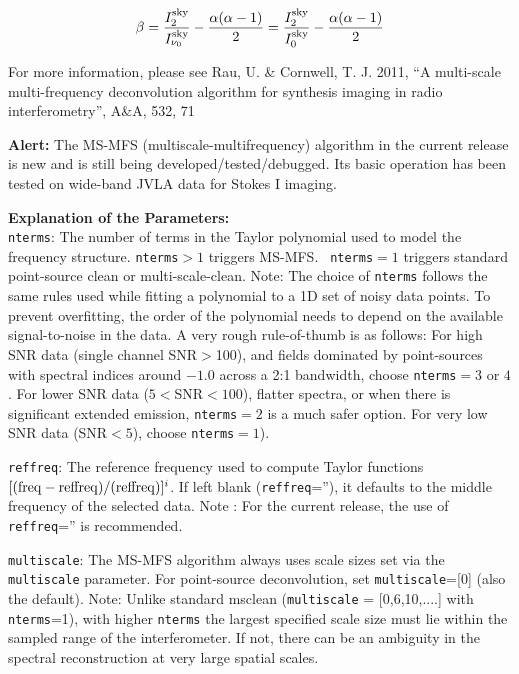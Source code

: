 \begin{equation}
\beta=\frac{I_2^{\rm sky}}{I_{\nu_0}^{\rm sky}}-\frac{\alpha(\alpha-1)}{2}=\frac{I_2^{\rm sky}}{I_{0}^{\rm sky}}-\frac{\alpha(\alpha-1)}{2}
\label{eq.ia:taylorbeta}
\end{equation}



For more information, please see Rau, U. \& Cornwell, T. J. 2011, ``A
multi-scale multi-frequency deconvolution algorithm for synthesis
imaging in radio interferometry'', A\&A, 532, 71 %

{\bf Alert:} The MS-MFS (multiscale-multifrequency) algorithm in the
current release is new and is still being
developed/tested/debugged. Its basic operation has been tested on
wide-band JVLA data for Stokes I imaging.

{\bf Explanation of the Parameters:} \\
{\tt nterms}: The number of terms in the Taylor polynomial used to
model the frequency structure.  {\tt nterms}$>1$ triggers MS-MFS. {\tt
  nterms}$=1$ triggers standard point-source clean or
multi-scale-clean.  Note: The choice of {\tt nterms} follows the same
rules used while fitting a polynomial to a 1D set of noisy data
points. To prevent overfitting, the order of the polynomial needs to
depend on the available signal-to-noise in the data.  A very rough
rule-of-thumb is as follows: For high SNR data (single channel
SNR$>$100), and fields dominated by point-sources with spectral
indices around $-1.0$ across a 2:1 bandwidth, choose {\tt nterms}$=3$
or $4$. For lower SNR data ($5<$SNR$<100$), flatter spectra, or when
there is significant extended emission, {\tt nterms}$=2$ is a much
safer option. For very low SNR data (SNR$<5$), choose {\tt nterms}$=1$).



{\tt reffreq}: The reference frequency used to compute Taylor
functions $[ ({\rm freq} - {\rm reffreq})/({\rm reffreq}) ]^{i}$.  If
left blank ({\tt reffreq}=''), it defaults to the middle frequency of
the selected data.  Note : For the current release, the use of {\tt
  reffreq}='' is recommended.



{\tt multiscale}: The MS-MFS algorithm always uses scale sizes set via
the {\tt multiscale} parameter.  For point-source deconvolution, set
{\tt multiscale}=[0] (also the default).  Note: Unlike standard
msclean ({\tt multiscale} = [0,6,10,....] with {\tt nterms}=1), with
higher {\tt nterms} the largest specified scale size must lie within
the sampled range of the interferometer. If not, there can be an
ambiguity in the spectral reconstruction at very large spatial scales.

